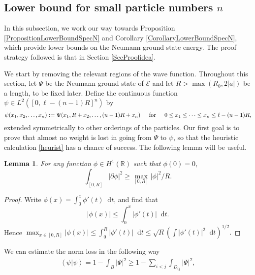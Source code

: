 \documentclass[a4paper,11pt]{article}
\newcommand{\abs}[1]{\left\lvert #1 \right\rvert}
\renewcommand{\braket}[1]{\left\langle#1\right\rangle}
\newcommand*\diff{\mathop{}\!\mathrm{d}}
\newcommand{\R}{\mathbb{R}}
\newtheorem{lemma}[theorem]{Lemma}
\numberwithin{equation}{section}
\begin{document}
	\subsection{Lower bound for small particle numbers $n$}
	\label{seclowsmalln}
	In this subsection, we work our way towards Proposition \ref{PropositionLowerBoundSpecN} and Corollary \ref{CorollaryLowerBoundSpecN}, which provide lower bounds on the Neumann ground state energy. The proof strategy followed is that in Section \ref{SecProofidea}.
	
	We start by removing the relevant regions of the wave function. Throughout this section, let $ \Psi $ be the Neumann ground state of $\mathcal{E}$ and let $R>\max\left(R_0,2\abs{a}\right)$ be a length, to be fixed later. Define the continuous function $ \psi\in L^2([0,\ell-(n-1)R]^n) $ by
	\begin{equation}
	\label{defpsi}
	  \psi(x_1,x_2,\dots,x_n):=\Psi(x_1,R+x_2,\dots,(n-1)R+x_n)\hspace{0.4cm}\text{ for }\hspace{0.4cm}0\leq x_1\leq\dots\leq x_n\leq \ell-(n-1)R, 
	\end{equation}
	extended symmetrically to other orderings of the particles. 
	Our first goal is to prove that almost no weight is lost in going from $\Psi$ to $\psi$, so that the heuristic calculation \eqref{heurist} has a chance of success. The following lemma will be useful.
	\begin{lemma}
		For any function $ \phi\in H^1(\R) $ such that $ \phi(0)=0 $, \begin{equation}\label{EqSobolevIneq}
		\int_{[0,R]}\abs{\partial\phi}^2\geq \max_{[0,R]}\abs{\phi}^2/R.
		\end{equation}
	\end{lemma}
	\begin{proof}
		Write $ \phi(x)=\int_{0}^{x}\phi'(t)\diff t $, and find that \begin{equation}
		\abs{\phi(x)}\leq \int_{0}^{x}\abs{\phi'(t)}\diff t.
		\end{equation}
		Hence $ \max_{x\in[0,R]}\abs{\phi(x)}\leq \int_{0}^{R}\abs{\phi'(t)}\diff t\leq \sqrt{R}\left(\int\abs{\phi'(t)}^2\diff t\right)^{1/2}. $
	\end{proof}
	We can estimate the norm loss in the following way
	\begin{equation}\label{EqNormBoundBij}
	\begin{aligned}
	\braket{\psi|\psi}=1-\int_{B}\abs{\Psi}^2\geq 1-\sum_{i<j}\int_{D_{ij}}\abs{\Psi}^2,
	\end{aligned}
	\end{equation}
\end{document}
